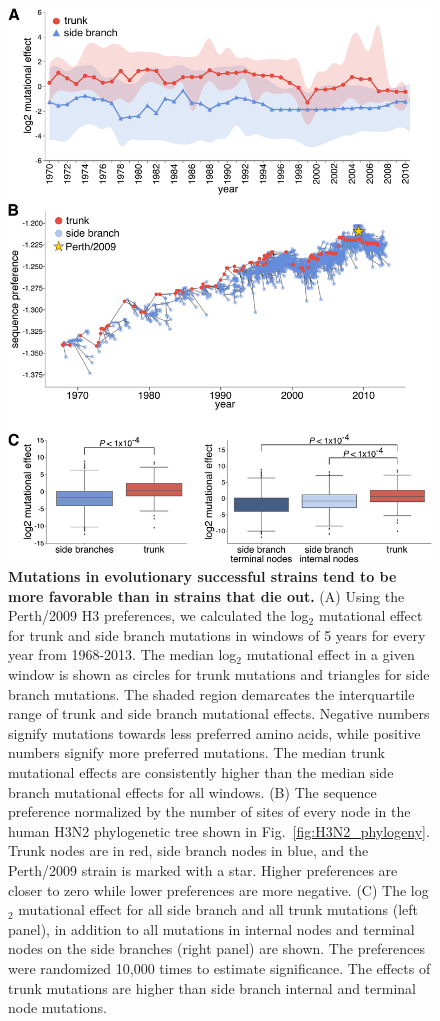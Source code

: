 \documentclass[9pt,twocolumn,twoside]{pnas-new}
\begin{document}
\begin{figure}
\centering
\includegraphics[width=11.4cm]{figs/trunkvssidebranch/trunkvssidebranch.pdf}
\caption{\label{fig:trunkvssidebranch}
{\bf Mutations in evolutionary successful strains tend to be more favorable than in strains that die out.}
(A) Using the Perth/2009 H3 preferences, we calculated the log$_{2}$ mutational effect for trunk and side branch mutations in windows of 5 years for every year from 1968-2013. 
The median log$_{2}$ mutational effect in a given window is shown as circles for trunk mutations and triangles for side branch mutations. 
The shaded region demarcates the interquartile range of trunk and side branch mutational effects.
Negative numbers signify mutations towards less preferred amino acids, while positive numbers signify more preferred mutations.
The median trunk mutational effects are consistently higher than the median side branch mutational effects for all windows.
(B) The sequence preference normalized by the number of sites of every node in the human H3N2 phylogenetic tree shown in Fig.~\ref{fig:H3N2_phylogeny}.
Trunk nodes are in red, side branch nodes in blue, and the Perth/2009 strain is marked with a star.
Higher preferences are closer to zero while lower preferences are more negative.
(C) The log$_{2}$ mutational effect for all side branch and all trunk mutations (left panel), in addition to all mutations in internal nodes and terminal nodes on the side branches (right panel) are shown.
The preferences were randomized 10,000 times to estimate significance.
The effects of trunk mutations are higher than side branch internal and terminal node mutations.
}
\end{figure}
\end{document}
